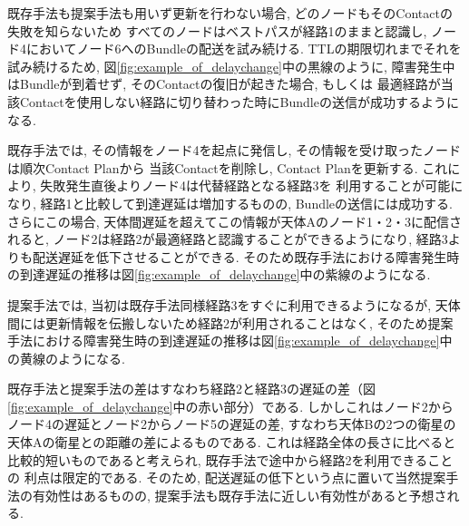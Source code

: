 
既存手法も提案手法も用いず更新を行わない場合, どのノードもそのContactの失敗を知らないため
すべてのノードはベストパスが経路1のままと認識し, ノード4においてノード6へのBundleの配送を試み続ける.
TTLの期限切れまでそれを試み続けるため, 図\ref{fig:example_of_delaychange}中の黒線のように, 
障害発生中はBundleが到着せず, そのContactの復旧が起きた場合, もしくは
最適経路が当該Contactを使用しない経路に切り替わった時にBundleの送信が成功するようになる. 

既存手法では, その情報をノード4を起点に発信し, その情報を受け取ったノードは順次Contact Planから
当該Contactを削除し, Contact Planを更新する. これにより, 失敗発生直後よりノード4は代替経路となる経路3を
利用することが可能になり, 経路1と比較して到達遅延は増加するものの, Bundleの送信には成功する. さらにこの場合, 
天体間遅延を超えてこの情報が天体Aのノード1・2・3に配信されると, 
ノード2は経路2が最適経路と認識することができるようになり, 経路3よりも配送遅延を低下させることができる. 
そのため既存手法における障害発生時の到達遅延の推移は図\ref{fig:example_of_delaychange}中の紫線のようになる. 

提案手法では, 当初は既存手法同様経路3をすぐに利用できるようになるが, 
天体間には更新情報を伝搬しないため経路2が利用されることはなく, 
そのため提案手法における障害発生時の到達遅延の推移は図\ref{fig:example_of_delaychange}中の黄線のようになる. 


既存手法と提案手法の差はすなわち経路2と経路3の遅延の差（図\ref{fig:example_of_delaychange}中の赤い部分）である.
しかしこれはノード2からノード4の遅延とノード2からノード5の遅延の差, 
すなわち天体Bの2つの衛星の天体Aの衛星との距離の差によるものである. 
これは経路全体の長さに比べると比較的短いものであると考えられ, 既存手法で途中から経路2を利用できることの
利点は限定的である. そのため, 配送遅延の低下という点に置いて当然提案手法の有効性はあるものの, 
提案手法も既存手法に近しい有効性があると予想される.  
  
